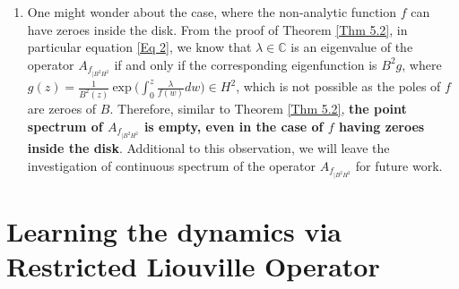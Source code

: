 \documentclass[preprint,12pt]{elsarticle} %
\theoremstyle{plain}
\theoremstyle{definition}
\theoremstyle{remark}
\begin{document}
\begin{enumerate}



\item One might wonder about the case, where the non-analytic function $f$ can have zeroes inside the disk. From the proof of Theorem \ref{Thm 5.2}, in particular equation \ref{Eq 2}, we know that $\lambda \in \mathbb{C}$ is an eigenvalue of the operator $A_{f_{|B^2 H^2}}$ if and only if the corresponding eigenfunction is $B^2g$, where $g(z)=\frac{1}{B^2(z)}~\text{exp}~\Big(\int_{0}^{z}\frac{\lambda}{f(w)}dw\Big)\in H^2$, which is not possible as the poles of $f$ are zeroes of $B$. Therefore, similar to Theorem \ref{Thm 5.2}, \textbf{the point spectrum of  $A_{f_{|B^2 H^2}}$ is empty, even in the case of $f$ having zeroes inside the disk}. Additional to this observation, we will leave the investigation of continuous spectrum of the operator $A_{f_{|B^2 H^2}}$ for future work.

\end{enumerate}



\section{Learning the dynamics via Restricted Liouville Operator}\label{Sec 7}
\end{document}
